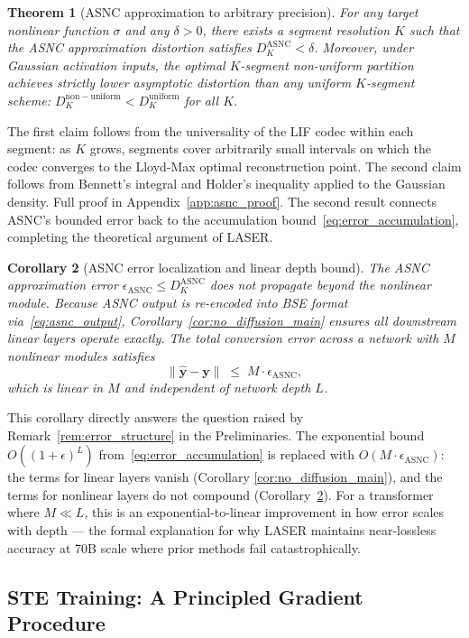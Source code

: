 \documentclass{article}
\theoremstyle{plain}
\newtheorem{theorem}{Theorem}[section]
\newtheorem{corollary}[theorem]{Corollary}
\theoremstyle{definition}
\theoremstyle{remark}
\begin{document}
\begin{theorem}[ASNC approximation to arbitrary precision]
\label{thm:asnc_bound}
For any target nonlinear function $\sigma$ and any $\delta > 0$, there exists a
segment resolution $K$ such that the ASNC approximation distortion satisfies
$D_K^{\mathrm{ASNC}} < \delta$. Moreover, under Gaussian activation inputs, the
optimal $K$-segment non-uniform partition achieves strictly lower asymptotic
distortion than any uniform $K$-segment scheme:
$D_K^{\mathrm{non-uniform}} < D_K^{\mathrm{uniform}}$ for all $K$.
\end{theorem}
The first claim follows from the universality of the LIF codec within each segment:
as $K$ grows, segments cover arbitrarily small intervals on which the codec converges
to the Lloyd-Max optimal reconstruction point. The second claim follows from
Bennett's integral and Holder's inequality applied to the Gaussian density. Full
proof in Appendix~\ref{app:asnc_proof}.
%
The second result connects ASNC's bounded error back to the accumulation
bound~\eqref{eq:error_accumulation}, completing the theoretical argument of LASER.
\begin{corollary}[ASNC error localization and linear depth bound]
\label{cor:asnc_local_main}
The ASNC approximation error $\epsilon_{\mathrm{ASNC}} \le D_K^{\mathrm{ASNC}}$
does not propagate beyond the nonlinear module. Because ASNC output is re-encoded
into BSE format via~\eqref{eq:asnc_output}, Corollary~\ref{cor:no_diffusion_main}
ensures all downstream linear layers operate exactly. The total conversion error
across a network with $M$ nonlinear modules satisfies
\[
\bigl\|\hat{\mathbf{y}} - \mathbf{y}\bigr\|
\;\le\; M \cdot \epsilon_{\mathrm{ASNC}},
\]
which is linear in $M$ and independent of network depth $L$.
\end{corollary}
 
This corollary directly answers the question raised by Remark~\ref{rem:error_structure}
in the Preliminaries. The exponential bound $O((1+\epsilon)^L)$
from~\eqref{eq:error_accumulation} is replaced with $O(M \cdot
\epsilon_{\mathrm{ASNC}})$: the terms for linear layers vanish (Corollary
\ref{cor:no_diffusion_main}), and the terms for nonlinear layers do not compound
(Corollary~\ref{cor:asnc_local_main}). For a transformer where $M \ll L$, this is an
exponential-to-linear improvement in how error scales with depth — the formal
explanation for why LASER maintains near-lossless accuracy at 70B scale where prior
methods fail catastrophically.

\subsection{STE Training: A Principled Gradient Procedure}
\label{subsec:ste}
\end{document}
